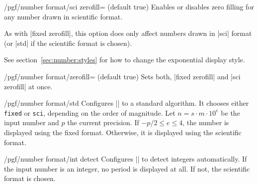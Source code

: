 \begin{key}{/pgf/number format/sci zerofill=  (default true)}
Enables or disables zero filling for any number drawn in scientific format.

\begin{codeexample}[]
\hspace{1em}
\hspace{1em}
\hspace{1em}
\hspace{1em}
\end{codeexample}
As with |fixed zerofill|, this option does only affect numbers drawn in |sci| format (or |std| if the scientific format is chosen).

See section~\ref{sec:number:styles} for how to change the exponential display style.
\end{key}

\begin{stylekey}{/pgf/number format/zerofill= (default true)}
	Sets both, |fixed zerofill| and |sci zerofill| at once.
\end{stylekey}

\begin{key}{/pgf/number format/std}
Configures |\pgfmathprintnumber| to a standard algorithm. It chooses either \texttt{fixed} or \texttt{sci}, depending on the order of magnitude. Let $n=s \cdot m \cdot 10^e$ be the input number and $p$ the current precision. If $-p/2 \le e \le 4$, the number is displayed using the fixed format. Otherwise, it is displayed using the scientific format. 

\begin{codeexample}[]
\hspace{1em}
\hspace{1em}
\hspace{1em}
\hspace{1em}
\end{codeexample}
\end{key}

\begin{key}{/pgf/number format/int detect}
Configures |\pgfmathprintnumber| to detect integers automatically. If the input number is an integer, no period is displayed at all. If not, the scientific format is chosen.

\begin{codeexample}[]
\hspace{1em}
\hspace{1em}
\hspace{1em}
\hspace{1em}
\end{codeexample}
\end{key}

